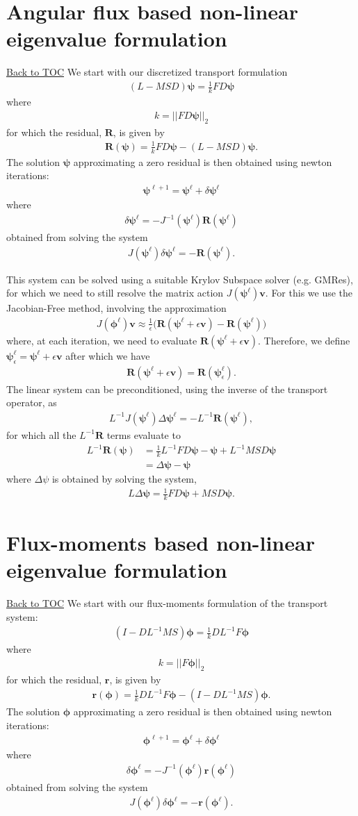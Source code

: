\documentclass[11pt,letterpaper,notitlepage]{article}
\newcommand{\beqn}{\begin{equation}
		\begin{aligned}}
\newcommand{\eeqn}{\end{aligned}
\end{equation}}
\numberwithin{equation}{section}
\newcommand{\Linv}{L^{-1}}
\newcommand{\bphi}{\boldsymbol{\phi}}
\newcommand{\bpsi}{\boldsymbol{\psi}}
\newcommand{\br}{\mathbf{r}}
\newcommand{\bR}{\mathbf{R}}
\newcommand{\BackToTOC}{\hyperlink{toc}{\scriptsize{\color{blue}Back to TOC}}\newline}
\begin{document}
\newpage
{}
\section{Angular flux based non-linear eigenvalue formulation}
\BackToTOC
We start with our discretized transport formulation
\beqn 
(L - MSD)\bpsi = \frac{1}{k} FD\bpsi
\eeqn 
where
\beqn 
k = ||FD\bpsi ||_2
\eeqn 
for which the residual, $\bR$, is given by
\beqn 
\bR(\bpsi) = \frac{1}{k} FD\bpsi - (L - MSD)\bpsi.
\eeqn 
The solution $\bpsi$ approximating a zero residual is then obtained using newton iterations:
\beqn 
\bpsi^{\ell+1} = \bpsi^\ell + \delta \bpsi^\ell
\eeqn 
where
\beqn 
\delta \bpsi^\ell = -J^{-1}(\bpsi^\ell) \bR(\bpsi^\ell)
\eeqn 
obtained from solving the system
\beqn 
J(\bpsi^{\ell}) \delta \bpsi^{\ell} = -\bR(\bpsi^{\ell}).
\eeqn 

This system can be solved using a suitable Krylov Subspace solver (e.g. GMRes), for which we need to still resolve the matrix action $J(\bpsi^{\ell})\mathbf{v}$. For this we use the Jacobian-Free method, involving the approximation 
\beqn 
J(\bphi^{\ell})\mathbf{v} \approx \frac{1}{\epsilon} \biggr(\bR(\bpsi^\ell + \epsilon \mathbf{v}) - \bR(\bpsi^\ell)\biggr)
\eeqn 
where, at each iteration, we need to evaluate $\bR(\bpsi^\ell + \epsilon \mathbf{v})$. Therefore, we define $\bpsi_\epsilon^\ell = \bpsi^\ell + \epsilon \mathbf{v}$ after which we have
\beqn 
\bR(\bpsi^\ell + \epsilon \mathbf{v}) = \bR(\bpsi_\epsilon^\ell).
\eeqn 
\newline
\newline
The linear system can be preconditioned, using the inverse of the transport operator, as
\beqn 
\Linv J(\bpsi^{\ell}) \Delta \bpsi^{\ell} = -\Linv \bR(\bpsi^{\ell}),
\eeqn 
for which all the $\Linv \bR$ terms evaluate to
\beqn
\Linv \bR(\bpsi) &= \frac{1}{k} \Linv FD\bpsi - \bpsi + \Linv MSD\bpsi \\
&= \Delta \bpsi - \bpsi
\eeqn 
where $\Delta \psi$ is obtained by solving the system,
\beqn 
L\Delta \bpsi = \frac{1}{k} FD\bpsi + MSD\bpsi.
\eeqn 

\newpage
{}
\section{Flux-moments based non-linear eigenvalue formulation}
\BackToTOC
We start with our flux-moments formulation of the transport system:
\beqn 
(I-D\Linv MS) \bphi = \frac{1}{k} D\Linv F\bphi
\eeqn 
where 
\beqn 
k = ||F\bphi ||_2
\eeqn 
for which the residual, $\br$, is given by
\beqn 
\br(\bphi) = \frac{1}{k} D\Linv F\bphi - (I-D\Linv MS) \bphi.
\eeqn 
The solution $\bphi$ approximating a zero residual is then obtained using newton iterations:
\beqn 
\bphi^{\ell+1} = \bphi^{\ell}  + \delta \bphi^{\ell}
\eeqn
where
\beqn
\delta \bphi^{\ell} = - J^{-1}(\bphi^{\ell}) \br(\bphi^{\ell})
\eeqn 
obtained from solving the system
\beqn 
J(\bphi^{\ell}) \delta \bphi^{\ell} = -\br(\bphi^{\ell}).
\eeqn 
\end{document}
